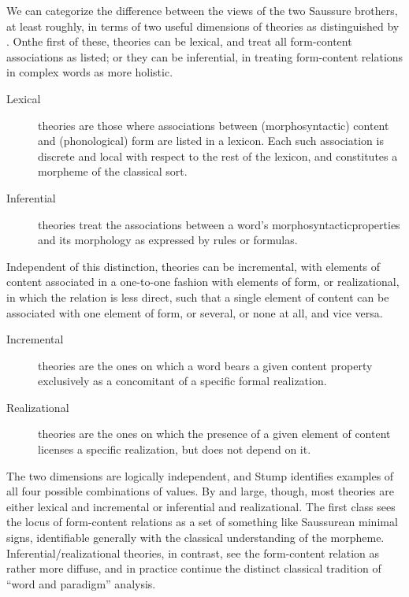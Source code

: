 \documentclass[output=paper]{langsci/langscibook}
\begin{document}
We can categorize the difference between the views of the two Saussure
brothers, at least roughly, in terms of two useful dimensions of
theories as distinguished by . On\largerpage[1]
the first of these, theories can be lexical, and treat all
form-content associations as listed; or they can be inferential, in
treating form-content relations in complex words as more holistic.
\begin{description}
\item[Lexical] theories are those where associations between
  (morphosyntactic) content and (phonological) form are listed in a
  lexicon. Each such association is discrete and local with respect to
  the rest of the lexicon, and constitutes a morpheme of the classical
  sort.
\item[Inferential] theories treat the associations between a word’s
  morphosyntactic\linebreak properties and its morphology as expressed by rules
  or formulas.
\end{description}

Independent of this distinction, theories can be incremental, with
elements of content associated in a one-to-one fashion with elements
of form, or realizational, in which the relation is less direct, such
that a single element of content can be associated with one element of
form, or several, or none at all, and vice versa.
\begin{description}
\item[Incremental] theories are the ones on which a word bears a given
  content property exclusively as a concomitant of a specific formal
  realization.
\item[Realizational] theories are the ones on which the presence of a
  given element of content licenses a specific realization, but does
  not depend on it. 
\end{description}

The two dimensions are logically independent, and Stump identifies
examples of all four possible combinations of values. By and large,
though, most theories are either lexical and incremental or
inferential and realizational. The first class sees the locus of
form-content relations as a set of something like Saussurean minimal
signs, identifiable generally with the classical understanding of the
morpheme.  Inferential/realizational theories, in contrast, see the
form-content relation as rather more diffuse, and in practice continue
the distinct classical tradition of ``word and paradigm'' analysis. 
\end{document}
